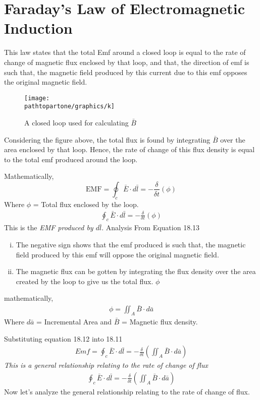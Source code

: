 \section{Faraday's Law of Electromagnetic Induction} 
This law states that the total Emf around a closed loop is equal to the rate of change of magnetic flux enclosed by that loop, and that, the direction of emf is such that, the magnetic field produced by this current due to this emf opposes the original magnetic field.
\begin{figure}[h]
\centering
\texttt{[image: \\pathtopartone/graphics/k]}
\caption{A closed loop used for calculating $\bar{B}$}
\label{fig:k}
\end{figure}

Considering the figure above, the total flux is found by integrating $\bar{B}$ over the area enclosed by that loop. Hence, the rate of change of this flux density is equal to the total emf produced around the loop.

Mathematically,
\begin{dmath}
\text{EMF} = \oint_c\bar{E} \cdot d\bar{l} = -\frac{\delta}{\delta t}(\phi)
\end{dmath}
Where $\phi$ = Total flux enclosed by the loop.
\begin{align}
\boxed{\oint_c\bar{E} \cdot d\bar{l} = -\frac{\delta}{\delta t}(\phi)}
\end{align}
This is the \emph{EMF produced by $d\bar{l}$}. Analysis From Equation 18.13
\begin{enumerate}[(i)]
\item The negative sign shows that the emf produced is such that, the magnetic field produced by this emf will oppose the original magnetic field. 
\item The magnetic flux can be gotten by integrating the flux density over the area created by the loop to give us the total flux. $\phi$ 
\end{enumerate}
mathematically,
\begin{align}
\phi = \iint_A\bar{B} \cdot d\bar{a}
\end{align}
Where $d\bar{a}$ = Incremental Area and $\bar{B}$ = Magnetic flux density.

Substituting equation 18.12 into 18.11 
\begin{align*}
\boxed{Emf = \oint_c\bar{E}\cdot d\bar{l} = -\frac{\delta}{\delta t} (\iint_A\bar{B}\cdot d\bar{a})}
\end{align*}
\emph{This is a general relationship relating to the rate of change of flux}	
\begin{align}
\boxed{\oint_c\bar{E}\cdot d\bar{l} = -\frac{\delta}{\delta t} (\iint_A\bar{B}\cdot d\bar{a})}
\end{align} 
Now let's analyze the general relationship relating to the rate of change of flux.

